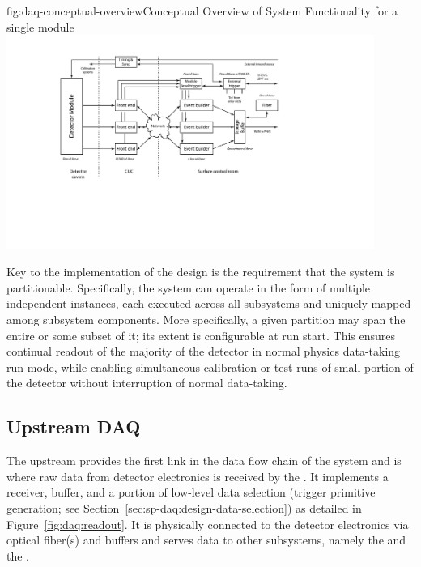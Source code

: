 \begin{dunefigure}{fig:daq-conceptual-overview}{Conceptual
   Overview of  System Functionality for a single \nominalmodsize module}
  \includegraphics[width=0.9\textwidth]{daq-overview.pdf}
\end{dunefigure}

Key to the implementation of the  design is the requirement that
the system is partitionable. Specifically, the system can operate in
the form of multiple independent  instances, each 
executed across all  subsystems and uniquely mapped among subsystem components. 
More specifically, a given partition may span the entire %
 or some subset of it; its extent is configurable at
run start. This ensures continual readout of the
majority of the detector in normal physics data-taking run mode, while
enabling simultaneous calibration or test runs of small portion of the
detector without interruption of normal data-taking. 

\subsection{Upstream DAQ}
\label{sec:daq:design-upstream}

The upstream  provides the first link in the data flow chain of
the  system and is where raw data from detector electronics
is received by the .
It implements a receiver, buffer, and a portion of low-level data
selection (trigger primitive generation; see Section~\ref{sec:sp-daq:design-data-selection}) as detailed in Figure~\ref{fig:daq:readout}.
It is physically connected to the detector electronics via optical
fiber(s) and buffers and serves data to other  subsystems,
namely the  and the .

